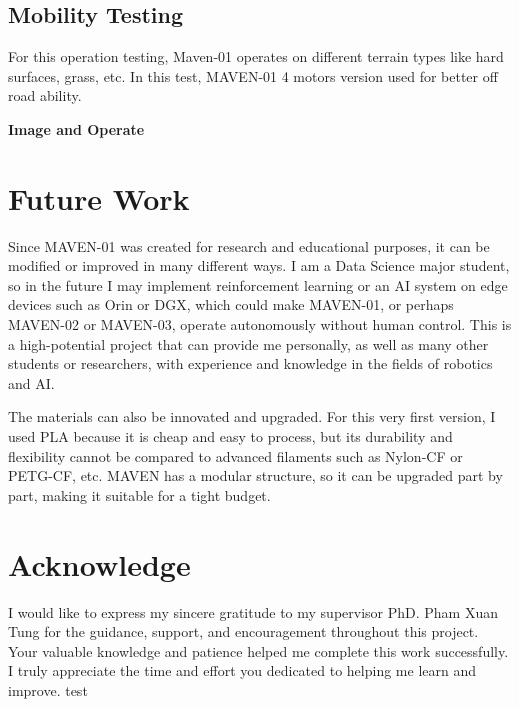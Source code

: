 \subsection{Mobility Testing}
\par
For this operation testing, Maven-01 operates on different terrain types like hard surfaces, grass, etc. In this test, MAVEN-01 4 motors version
used for better off road ability. 

\textbf{Image and Operate}

\section{Future Work}
\par
Since MAVEN-01 was created for research and educational purposes, it can be modified or 
improved in many different ways. I am a Data Science major student, so in the future I may implement 
reinforcement learning or an AI system on edge devices such as Orin or DGX, which could make MAVEN-01, or perhaps MAVEN-02 or MAVEN-03, operate autonomously 
without human control. This is a high-potential project that can provide me personally, as well as many other students 
or researchers, with experience and knowledge in the fields of robotics and AI.

\vspace{0.5em}
\par 
The materials can also be innovated and upgraded. For this very first version, I used PLA because it is cheap 
and easy to process, but its durability and flexibility cannot be compared to advanced filaments such as Nylon-CF or 
PETG-CF, etc. MAVEN has a modular structure, so it can be upgraded part by part, making it suitable for a tight budget.

\section{Acknowledge}

I would like to express my sincere gratitude to my supervisor PhD. Pham Xuan Tung for the guidance, support, and encouragement throughout this project. 
Your valuable knowledge and patience helped me complete this work successfully. I truly appreciate the time and effort you dedicated to helping me learn and improve.
test
